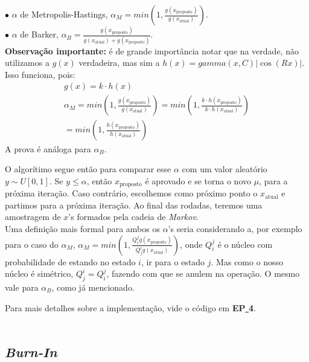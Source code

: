 \documentclass[pt12]{article}
\begin{document}
\indent $\bullet$ $\alpha$ de Metropolis-Hastings, $\displaystyle{\alpha_M = min\left(1, \frac{g(x_{\text{proposto}})}{g(x_{\text{atual}})}\right)}$.\\

\indent $\bullet$ $\alpha$ de Barker, $\displaystyle{\alpha_B = \frac{g(x_{\text{proposto}})}{g(x_{\text{atual}})+g(x_{\text{proposto}})}}$.\\

\indent \textbf{Observação importante:} é de grande importância notar que na verdade, não utilizamos a $g(x)$ verdadeira, mas sim a $h(x) = gamma(x,C)|\cos(Rx)|$. Isso funciona, pois:\\

\begin{align}
g(x) = k\cdot h(x)\\
\displaystyle{\alpha_M = min\left(1, \frac{g(x_{\text{proposto}})}{g(x_{\text{atual}})}\right)} = \displaystyle{ min\left(1, \frac{k\cdot h(x_{\text{proposto}})}{k\cdot h(x_{\text{atual}})}\right)}\\
= \displaystyle{ min\left(1, \frac{h(x_{\text{proposto}})}{h(x_{\text{atual}})}\right)}
\end{align}
A prova é análoga para $\alpha_B$.

\newpage

\indent O algorítimo segue então para comparar esse $\alpha$ com um valor aleatório $y \sim U[0,1]$. Se $y \leq \alpha$, então $x_{\text{proposto}}$ é aprovado e se torna o novo $\mu$, para a próxima iteração. Caso contrário, escolhemos como próximo ponto o $x_{\text{atual}}$ e partimos para a próxima iteração. Ao final das rodadas, teremos uma amostragem de $x$'s formados pela cadeia de \textit{Markov}.\\

Uma definição mais formal para ambos os $\alpha$'s seria considerando a, por exemplo para o caso do $\alpha_M$, $\displaystyle{\alpha_M = min\left(1, \frac{Q_i^j g(x_{\text{proposto}})}{Q_j^i g(x_{\text{atual}})} \right)}$, onde $Q_i^j$ é o núcleo com probabilidade de estando no estado $i$, ir para o estado $j$. Mas como o nosso núcleo é simétrico, $Q_j^i = Q_i^j$, fazendo com que se anulem na operação. O mesmo vale para $\alpha_B$, como já mencionado.

Para mais detalhes sobre a implementação, vide o código em \textbf{EP\underline{ }4}.\\
\ 

\subsection{\textit{Burn-In}}
\ 
\end{document}
